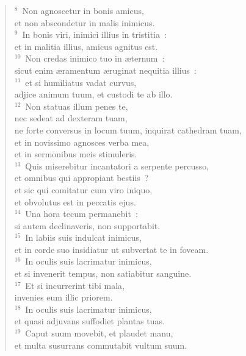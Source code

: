 \begin{flushleft}\begin{verse}${}^{8}$~Non agnoscetur in bonis amicus,\\ et non abscondetur in malis inimicus.\\
${}^{9}$~In bonis viri, inimici illius in tristitia~:\\ et in malitia illius, amicus agnitus est.\\
${}^{10}$~Non credas inimico tuo in \ae ternum~:\\ sicut enim \ae ramentum \ae ruginat nequitia illius~:\\
${}^{11}$~et si humiliatus vadat curvus,\\ adjice animum tuum, et custodi te ab illo.\\
${}^{12}$~Non statuas illum penes te,\\ nec sedeat ad dexteram tuam,\\ ne forte conversus in locum tuum, inquirat cathedram tuam,\\ et in novissimo agnosces verba mea,\\ et in sermonibus meis stimuleris.\\
${}^{13}$~Quis miserebitur incantatori a serpente percusso,\\ et omnibus qui appropiant bestiis~?\\ et sic qui comitatur cum viro iniquo,\\ et obvolutus est in peccatis ejus.\\
${}^{14}$~Una hora tecum permanebit~:\\ si autem declinaveris, non supportabit.\\
${}^{15}$~In labiis suis indulcat inimicus,\\ et in corde suo insidiatur ut subvertat te in foveam.\\
${}^{16}$~In oculis suis lacrimatur inimicus,\\ et si invenerit tempus, non satiabitur sanguine.\\
${}^{17}$~Et si incurrerint tibi mala,\\ invenies eum illic priorem.\\
${}^{18}$~In oculis suis lacrimatur inimicus,\\ et quasi adjuvans suffodiet plantas tuas.\\
${}^{19}$~Caput suum movebit, et plaudet manu,\\ et multa susurrans commutabit vultum suum.\end{verse}\end{flushleft}


